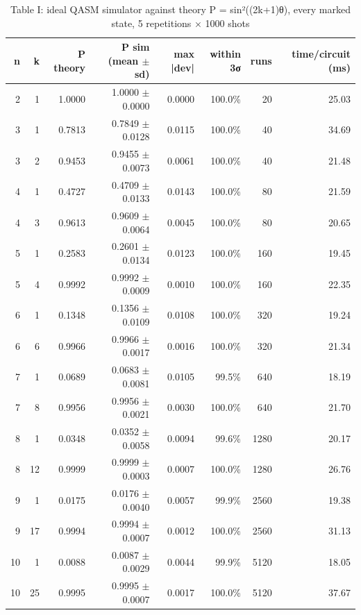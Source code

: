 \begin{table}[t]
\centering
\small
\caption{Table I: ideal QASM simulator against theory P = sin²((2k+1)θ), every marked state, 5 repetitions × 1000 shots}
\label{tab:I}
\begin{tabular}{rrrrrrrr}
\toprule
n & k & P theory & P sim (mean $\pm$ sd) & max |dev| & within 3σ & runs & time/circuit (ms) \\
\midrule
2 & 1 & 1.0000 & 1.0000 $\pm$ 0.0000 & 0.0000 & 100.0\% & 20 & 25.03 \\
3 & 1 & 0.7813 & 0.7849 $\pm$ 0.0128 & 0.0115 & 100.0\% & 40 & 34.69 \\
3 & 2 & 0.9453 & 0.9455 $\pm$ 0.0073 & 0.0061 & 100.0\% & 40 & 21.48 \\
4 & 1 & 0.4727 & 0.4709 $\pm$ 0.0133 & 0.0143 & 100.0\% & 80 & 21.59 \\
4 & 3 & 0.9613 & 0.9609 $\pm$ 0.0064 & 0.0045 & 100.0\% & 80 & 20.65 \\
5 & 1 & 0.2583 & 0.2601 $\pm$ 0.0134 & 0.0123 & 100.0\% & 160 & 19.45 \\
5 & 4 & 0.9992 & 0.9992 $\pm$ 0.0009 & 0.0010 & 100.0\% & 160 & 22.35 \\
6 & 1 & 0.1348 & 0.1356 $\pm$ 0.0109 & 0.0108 & 100.0\% & 320 & 19.24 \\
6 & 6 & 0.9966 & 0.9966 $\pm$ 0.0017 & 0.0016 & 100.0\% & 320 & 21.34 \\
7 & 1 & 0.0689 & 0.0683 $\pm$ 0.0081 & 0.0105 & 99.5\% & 640 & 18.19 \\
7 & 8 & 0.9956 & 0.9956 $\pm$ 0.0021 & 0.0030 & 100.0\% & 640 & 21.70 \\
8 & 1 & 0.0348 & 0.0352 $\pm$ 0.0058 & 0.0094 & 99.6\% & 1280 & 20.17 \\
8 & 12 & 0.9999 & 0.9999 $\pm$ 0.0003 & 0.0007 & 100.0\% & 1280 & 26.76 \\
9 & 1 & 0.0175 & 0.0176 $\pm$ 0.0040 & 0.0057 & 99.9\% & 2560 & 19.38 \\
9 & 17 & 0.9994 & 0.9994 $\pm$ 0.0007 & 0.0012 & 100.0\% & 2560 & 31.13 \\
10 & 1 & 0.0088 & 0.0087 $\pm$ 0.0029 & 0.0044 & 99.9\% & 5120 & 18.05 \\
10 & 25 & 0.9995 & 0.9995 $\pm$ 0.0007 & 0.0017 & 100.0\% & 5120 & 37.67 \\
\bottomrule
\end{tabular}
\end{table}
